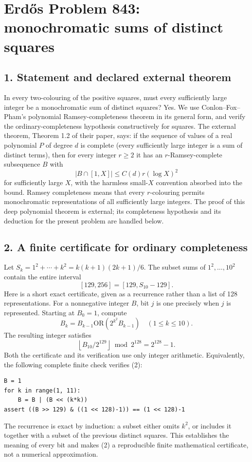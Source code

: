 \section*{Erd\H{o}s Problem 843: monochromatic sums of distinct squares}
\subsection*{1. Statement and declared external theorem}
In every two-colouring of the positive squares, must every sufficiently large integer be a monochromatic sum of distinct squares? Yes. We use Conlon--Fox--Pham's polynomial Ramsey-completeness theorem in its general form, and verify the ordinary-completeness hypothesis constructively for squares.
The external theorem, Theorem 1.2 of their paper, says: if the sequence of values of a real polynomial $P$ of degree $d$ is complete (every sufficiently large integer is a sum of distinct terms), then for every integer $r\ge2$ it has an $r$-Ramsey-complete subsequence $B$ with
\[
 |B\cap[1,X]|\le C(d)r(\log X)^2
\]
for sufficiently large $X$, with the harmless small-$X$ convention absorbed into the bound. Ramsey completeness means that every $r$-colouring permits monochromatic representations of all sufficiently large integers. The proof of this deep polynomial theorem is external; its completeness hypothesis and its deduction for the present problem are handled below.
\subsection*{2. A finite certificate for ordinary completeness}
Let $S_k=1^2+\cdots+k^2=k(k+1)(2k+1)/6$. The subset sums of $1^2,\ldots,10^2$ contain the entire interval
\[
 [129,256]=[129,S_{10}-129].                              \tag{1}
\]
Here is a short exact certificate, given as a recurrence rather than a list of 128 representations. For a nonnegative integer $B$, bit $j$ is one precisely when $j$ is represented. Starting at $B_0=1$, compute
\[
 B_k=B_{k-1}\mathbin{\mathrm{OR}}(2^{k^2}B_{k-1})\quad(1\le k\le10).
\]
The resulting integer satisfies
\[
 \left\lfloor B_{10}/2^{129}\right\rfloor\bmod2^{128}=2^{128}-1.             \tag{2}
\]
Both the certificate and its verification use only integer arithmetic. Equivalently, the following complete finite check verifies (2):
\begin{verbatim}
B = 1
for k in range(1, 11):
    B = B | (B << (k*k))
assert ((B >> 129) & ((1 << 128)-1)) == (1 << 128)-1
\end{verbatim}
The recurrence is exact by induction: a subset either omits $k^2$, or includes it together with a subset of the previous distinct squares. This establishes the meaning of every bit and makes (2) a reproducible finite mathematical certificate, not a numerical approximation.
